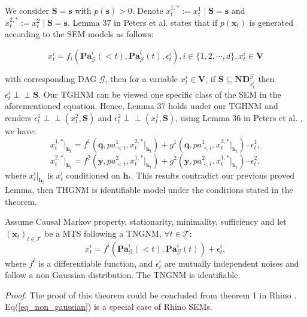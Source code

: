 We consider $\boldsymbol{S}=\boldsymbol{s}$ with $p(\boldsymbol{s})>0$. Denote $x_t^{1,*}:=x_t^1 \mid \boldsymbol{S}=\boldsymbol{s}$ and $x_t^{2,*}:=x_t^2 \mid \boldsymbol{S}=\boldsymbol{s}$. Lemma 37 in Peters et al. \citep{peters2014causal} states that if $p(\boldsymbol{x}_t)$ is generated according to the SEM models as follows:

$$
x^i_t=f_i\left(\mathbf{P a}_{\mathcal{G}}^i(<t), \mathbf{P a}_{\mathcal{G}}^i(t), \epsilon^i_t\right), i\in \{1,2, \cdots, d\}, x^i_t \in \boldsymbol{V}
$$

with corresponding DAG $\mathcal{G}$, then for a variable $x^i_t \in \boldsymbol{V}$, if $\boldsymbol{S} \subseteq \mathbf{N D}_{x^i_t}^{\mathcal{G}}$ then $\epsilon^i_t \perp\!\!\!\perp \boldsymbol{S}$. Our TGHNM can be viewed one specific class of the SEM in the aforementioned equation. Hence, Lemma 37 holds under our TGHNM and renders $\epsilon_t^1 \perp\!\!\!\perp (x_t^2, \boldsymbol{S})$ and $\epsilon_t^2 \perp\!\!\!\perp (x_t^1, \boldsymbol{S})$, using Lemma 36 in Peters et al. \citep{peters2014causal}, we have:
\begin{equation*}
    x_t^{1,*}|_{\boldsymbol{h}_t}= f^1\left(\boldsymbol{q},pa^1_{<t}, x_t^{2,*}|_{\boldsymbol{h}_t}\right)+g^1\left(\boldsymbol{q},pa^1_{<t}, x_t^{2,*}|_{\boldsymbol{h}_t}\right)\cdot\epsilon_t^{1},
\end{equation*} 
$$x_t^{2,*}|_{\boldsymbol{h}_t}= f^2\left(\boldsymbol{y},pa^2_{<t}, x_t^{1,*}|_{\boldsymbol{h}_t}\right)+g^2\left(\boldsymbol{y},pa^2_{<t}, x_t^{1,*}|_{\boldsymbol{h}_t}\right)\cdot\epsilon_t^{2},$$
where $x_t^i|_{\boldsymbol{h}_t}$ is $x_t^i$ conditioned on $\boldsymbol{h}_t$. This results contradict our previous proved Lemma, then THGNM is identifiable model under the conditions stated in the theorem.
\begin{theorem}
Assume Causal Markov property, stationarity, minimality, sufficiency and let $(\boldsymbol{x}_t)_{t \in \mathcal{T}}$ be a MTS following a TNGNM, $\forall t \in \mathcal{T}$:
\begin{equation}
  x_t^i= f^i\left(\mathbf{P a}_{\mathcal{G}}^i(<t), \mathbf{P a}_{\mathcal{G}}^i(t)\right)+\epsilon_t^{i},
\label{eq_non_gaussian}
\end{equation}  
where $f^i$ is a differentiable function, and $\epsilon^{i}_t$ are mutually independent noises and follow a non Gaussian distribution. The TNGNM is identifiable.  \end{theorem}
\textit{Proof. }The proof of this theorem could be concluded from theorem 1 in Rhino \citep{gong2022rhino}. Eq(\ref{eq_non_gaussian}) is a special case of Rhino SEMs.
